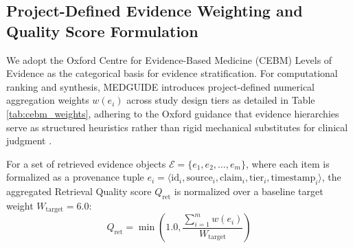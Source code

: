 \documentclass[journal,10pt,twocolumn]{IEEEtran}
\begin{document}
\subsection{Project-Defined Evidence Weighting and Quality Score Formulation}
We adopt the Oxford Centre for Evidence-Based Medicine (CEBM) Levels of Evidence \cite{cebm2011} as the categorical basis for evidence stratification. For computational ranking and synthesis, MEDGUIDE introduces project-defined numerical aggregation weights $w(e_i)$ across study design tiers as detailed in Table \ref{tab:cebm_weights}, adhering to the Oxford guidance that evidence hierarchies serve as structured heuristics rather than rigid mechanical substitutes for clinical judgment \cite{cebm2011}.

For a set of retrieved evidence objects $\mathcal{E} = \{e_1, e_2, \dots, e_m\}$, where each item is formalized as a provenance tuple $e_i = \langle \text{id}_i, \text{source}_i, \text{claim}_i, \text{tier}_i, \text{timestamp}_i \rangle$, the aggregated Retrieval Quality score $Q_{\text{ret}}$ is normalized over a baseline target weight $W_{\text{target}} = 6.0$:
\begin{equation}
Q_{\text{ret}} = \min\left(1.0, \frac{\sum_{i=1}^m w(e_i)}{W_{\text{target}}}\right)
\end{equation}
\end{document}
